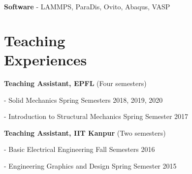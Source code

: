 \documentclass[margin,line]{resume}
\begin{document}
\begin{resume}
    \textbf{\textsf{Software}} -  LAMMPS, ParaDis, Ovito, Abaqus, VASP

    \section{\mysidestyle Teaching \\Experiences}

    \textbf{\textsf{Teaching Assistant, EPFL}} \textsf{(Four semesters)}
    \vspace{-0.3cm}\begin{compactitem}
        \item[-] Solid Mechanics \hfill \small{Spring  Semesters 2018, 2019, 2020}
        \item[-] Introduction to Structural Mechanics  \hfill \small{Spring  Semester 2017}
    \end{compactitem}

    \textbf{\textsf{Teaching Assistant, IIT Kanpur}} \textsf{(Two semesters)}
    \vspace{-0.3cm}\begin{compactitem}
        \item[-] Basic Electrical Engineering \hfill \small{Fall  Semesters 2016}
        \item[-] Engineering Graphics and Design  \hfill \small{Spring  Semester 2015}
    \end{compactitem}





    ­%


\end{resume}
\end{document}
